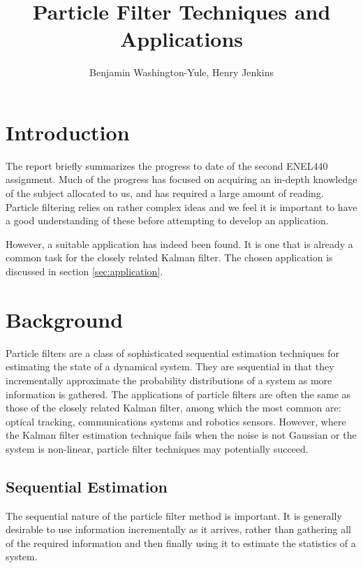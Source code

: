 \documentclass[11pt]{article}
\begin{document}
\title{Particle Filter Techniques and Applications}
\author{Benjamin Washington-Yule, Henry Jenkins}
\maketitle

\section{Introduction}
The report briefly summarizes the progress to date of the second ENEL440
assignment. Much of the progress has focused on acquiring an in-depth knowledge
of the subject allocated to us, and has required a large amount of reading.
Particle filtering relies on rather complex ideas and we feel it is important to
have a good understanding of these before attempting to develop an application.

However, a suitable application has indeed been found. It is one that is already
a common task for the closely related Kalman filter. The chosen application is
discussed in section \ref{sec:application}.

\section{Background}
Particle filters are a class of sophisticated sequential estimation techniques
for estimating the state of a dynamical system. They are sequential in that they
incrementally approximate the probability distributions of a system as more
information is gathered. The applications of particle filters are often the
same as those of the closely related Kalman filter, among which the most common
are: optical tracking, communications systems and robotics sensors. However,
where the Kalman filter estimation technique fails when the noise is not
Gaussian or the system is non-linear, particle filter techniques may potentially
succeed.

\subsection{Sequential Estimation}
The sequential nature of the particle filter method is important. It is
generally desirable to use information incrementally as it arrives, rather
than gathering all of the required information and then finally using it to
estimate the statistics of a system. 
\end{document}

